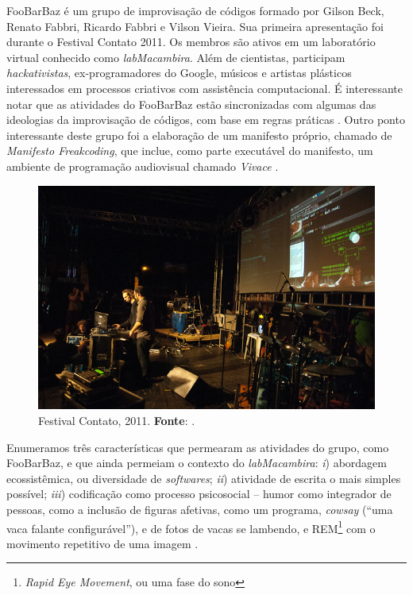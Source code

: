 FooBarBaz é um grupo de improvisação de códigos formado por Gilson Beck, Renato Fabbri, Ricardo Fabbri e Vilson Vieira. Sua primeira apresentação foi durante o Festival Contato 2011. Os membros são ativos em um laboratório virtual conhecido como \emph{labMacambira}. Além de cientistas, participam \emph{hackativistas}, ex-programadores do Google, músicos e artistas plásticos interessados em processos criativos com assistência computacional. É interessante notar que as atividades do FooBarBaz estão sincronizadas com algumas das ideologias da improvisação de códigos, com base em regras práticas . Outro ponto interessante deste grupo foi a elaboração de um manifesto próprio, chamado de \emph{Manifesto Freakcoding}, que inclue, como parte executável do manifesto, um ambiente de programação audiovisual chamado \emph{Vivace} \cite{vieira_vivace:_2015}.
 
\begin{figure}[!h]
  \centering
  \includegraphics[scale=0.71]{imagens/Foobarbaz1.jpg}
  \caption{Festival Contato, 2011. \textbf{Fonte}: .}
  \label{fig:foobarbaz}
\end{figure}

Enumeramos três características que permearam as atividades do grupo, como FooBarBaz, e que ainda permeiam o contexto do \emph{labMacambira}: \emph{i}) abordagem ecossistêmica, ou diversidade de \emph{softwares}; \emph{ii}) atividade de escrita o mais simples possível; \emph{iii}) codificação como processo psicosocial -- humor como integrador de pessoas, como a inclusão de figuras afetivas, como um programa, \emph{cowsay} (``uma vaca falante configurável''), e de fotos de vacas se lambendo, e REM\footnote{\emph{Rapid Eye Movement}, ou uma fase do sono} com o movimento repetitivo de uma imagem  . 

